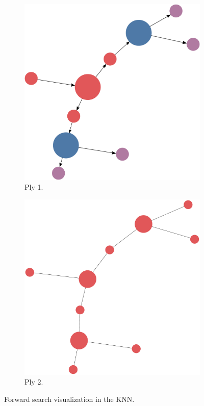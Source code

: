 \documentclass[titlepage,11pt]{article}
\begin{document}
\begin{figure}
\begin{subfigure}[!htb]{0.32\textwidth}
		\includegraphics[width=\columnwidth]{figures/knn_simple_forward_think_1.pdf}
		\caption{Ply 1.}
	\end{subfigure}
	\begin{subfigure}[!htb]{0.32\textwidth}
		\centering
		\includegraphics[width=\columnwidth]{figures/knn_simple_forward_think_2.pdf}
		\caption{Ply 2.}
	\end{subfigure}
	\caption{Forward search visualization in the KNN.}
	\label{fig:forward_search_test}
\end{figure}
\end{document}

